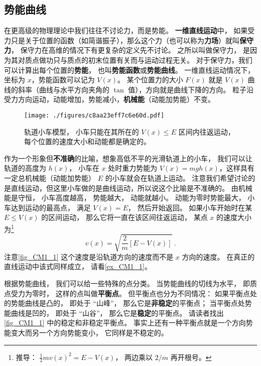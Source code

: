 \subsection{势能曲线}
在更高级的物理理论中我们往往不讨论力，而是势能。 \textbf{一维直线运动}中， 如果受力只是关于位置的函数（如简谐振子），那么这个力（也可以称为\textbf{力场}）就叫\textbf{保守力}， 保守力在高维的情况下有更复杂的定义先不讨论。 之所以叫做保守力， 是因为其对质点做功只与质点的初末位置有关而与运动过程无关。 对于保守力，我们可以计算出每个位置的\textbf{势能}， 也叫\textbf{势能函数}或\textbf{势能曲线}。 一维直线运动情况下，坐标为 $x$，势能函数可以记为 $V(x)$。 某个位置力的大小 $F(x)$ 就是 $V(x)$ 曲线的斜率（曲线与水平方向夹角的 $\tan$ 值），方向就是曲线下降的方向。 粒子沿受力方向运动，动能增加，势能减小，\textbf{机械能}（动能加势能）不变。

\begin{figure}[ht]
\centering
\texttt{[image: ./figures/c8aa23eff7c6e60d.pdf]}
\caption{轨道小车模型， 小车只能在其所在的 $V(x) \leqslant E$ 区间内往返运动， 每个位置的速度大小和动能都是确定的。} \label{fig_CM1_1}
\end{figure}

作为一个形象但\textbf{不准确}的比喻，想象高低不平的光滑轨道上的小车， 我们可以让轨道的高度为 $h(x)$， 小车在 $x$ 处时重力势能为 $V(x) = mgh(x)$，这样具有一定总机械能（动能加势能） $E$ 的小车就会在轨道上运动。 注意我们希望讨论的是直线运动，但这里小车做的是曲线运动，所以说这个比喻是不准确的。 由机械能是守恒， 小车高度越高， 势能越大， 动能就越小。 动能为零时势能最大， 小车达到运动的最高点， 满足 $V(x) = E$， 然后开始返回。 如果小车开始时在某 $E \leq V(x)$ 的区间运动， 那么它将一直在该区间往返运动， 某点 $x$ 的速度大小为\footnote{推导： $\frac{1}{2}mv(x)^2 = E - V(x)$， 两边乘以 $2/m$ 再开根号。}
\begin{equation}\label{eq_CM1_1}
v(x) = \sqrt{\frac{2}{m}[E - V(x)]}~.
\end{equation}
注意\autoref{fig_CM1_1} 这个速度是沿轨道方向的速度而不是 $x$ 方向的速度。 在真正的直线运动中该式同样成立， 请看\autoref{ex_CM1_1}。

根据势能曲线， 我们可以给一些特殊的点分类。 当势能曲线的切线为水平， 即质点受力为零时， 这样的点叫做\textbf{平衡点}。 但平衡点也分为不同情况： 如果平衡点处的势能曲线是凸的， 即处于 “山峰”， 那么它是\textbf{非稳定}的平衡点； 当平衡点处势能曲线是凹的， 即处于 “山谷”， 那么它是\textbf{稳定}的平衡点。 请读者找出\autoref{fig_CM1_1} 中的稳定和非稳定平衡点。 事实上还有一种平衡点就是一个方向势能变大而另一个方向势能变小， 它同样是不稳定的。

